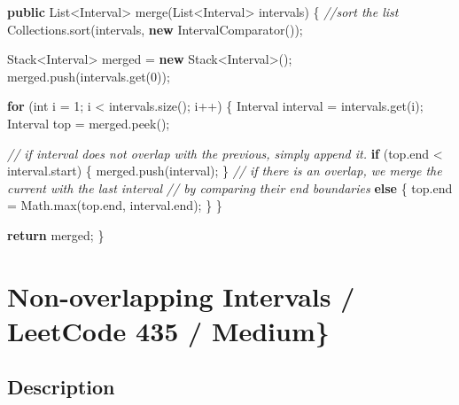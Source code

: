 \documentclass[]{book}
\newenvironment{Shaded}{\begin{snugshade}}{\end{snugshade}}
\newcommand{\BuiltInTok}[1]{#1}
\newcommand{\CommentTok}[1]{\textcolor[rgb]{0.56,0.35,0.01}{\textit{#1}}}
\newcommand{\DataTypeTok}[1]{\textcolor[rgb]{0.13,0.29,0.53}{#1}}
\newcommand{\DecValTok}[1]{\textcolor[rgb]{0.00,0.00,0.81}{#1}}
\newcommand{\FunctionTok}[1]{\textcolor[rgb]{0.00,0.00,0.00}{#1}}
\newcommand{\KeywordTok}[1]{\textcolor[rgb]{0.13,0.29,0.53}{\textbf{#1}}}
\newcommand{\NormalTok}[1]{#1}
\begin{document}
\begin{Shaded}
\begin{Highlighting}[]
\KeywordTok{public} \BuiltInTok{List}\NormalTok{<Interval> }\FunctionTok{merge}\NormalTok{(}\BuiltInTok{List}\NormalTok{<Interval> intervals) \{}
    \CommentTok{//sort the list}
    \BuiltInTok{Collections}\NormalTok{.}\FunctionTok{sort}\NormalTok{(intervals, }\KeywordTok{new} \FunctionTok{IntervalComparator}\NormalTok{());}

    \BuiltInTok{Stack}\NormalTok{<Interval> merged = }\KeywordTok{new} \BuiltInTok{Stack}\NormalTok{<Interval>();}
\NormalTok{    merged.}\FunctionTok{push}\NormalTok{(intervals.}\FunctionTok{get}\NormalTok{(}\DecValTok{0}\NormalTok{));}

    \KeywordTok{for}\NormalTok{ (}\DataTypeTok{int}\NormalTok{ i = }\DecValTok{1}\NormalTok{; i < intervals.}\FunctionTok{size}\NormalTok{(); i++) \{}
\NormalTok{        Interval interval = intervals.}\FunctionTok{get}\NormalTok{(i);}
\NormalTok{        Interval top = merged.}\FunctionTok{peek}\NormalTok{();}

        \CommentTok{// if interval does not overlap with the previous, simply append it.}
        \KeywordTok{if}\NormalTok{ (top.}\FunctionTok{end}\NormalTok{ < interval.}\FunctionTok{start}\NormalTok{) \{}
\NormalTok{            merged.}\FunctionTok{push}\NormalTok{(interval);}
\NormalTok{        \}}
        \CommentTok{// if there is an overlap, we merge the current with the last interval}
        \CommentTok{// by comparing their end boundaries}
        \KeywordTok{else}\NormalTok{ \{}
\NormalTok{            top.}\FunctionTok{end}\NormalTok{ = }\BuiltInTok{Math}\NormalTok{.}\FunctionTok{max}\NormalTok{(top.}\FunctionTok{end}\NormalTok{, interval.}\FunctionTok{end}\NormalTok{);}
\NormalTok{        \}}
\NormalTok{    \}}

    \KeywordTok{return}\NormalTok{ merged;}
\NormalTok{\}}
\end{Highlighting}
\end{Shaded}

\hypertarget{non-overlapping-intervals-leetcode-435-medium}{%
\section{Non-overlapping Intervals / LeetCode 435 / Medium\}}\label{non-overlapping-intervals-leetcode-435-medium}}

\hypertarget{description-20}{%
\subsection{Description}\label{description-20}}
\end{document}
